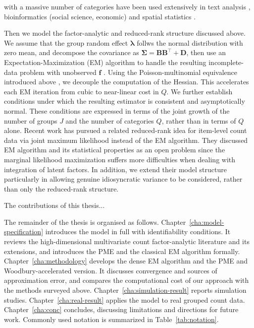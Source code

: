 with a massive number of categories have been used extensively in text analysis \citep{Taddy2015}, bioinformatics \citep{Smith2001, Buettner2015} (social science, economic) and spatial statistics \citep{Cressie2008}. 
\fi

Then we model the factor-analytic and reduced-rank structure discussed above. We assume that the group random effect $\bm{\lambda}$ follws the normal distribution with zero mean, and decompose the covariance as $\bm{\Sigma}=\mathbf{B}\mathbf{B}^{\top}+\mathbf{D}$, then use an Expectation-Maximization (EM) algorithm to handle the resulting incomplete-data problem with unobserved $\mathbf{f}$ . Using the Poisson-multinomial equivalence introduced above \citep{Baker1994, Taddy2015}, we decouple the computation of the Hessian. This accelerates each EM iteration from cubic to near-linear cost in $Q$. We further establish conditions under which the resulting estimator is consistent and asymptotically normal. These conditions are expressed in terms of the joint growth of the number of groups $J$ and the number of categories $Q$, rather than in terms of $Q$ alone. Recent work has pursued a related reduced-rank idea for item-level count data via joint maximum likelihood \citep{Cui2026} instead of the EM algorithm. They discussed EM algorithm and its statistical properties as an open problem since the marginal likelihood maximization suffers more difficulties when dealing with integration of latent factors. In addition, we extend their model structure particularly in allowing genuine idiosyncratic variance to be considered, rather than only the reduced-rank structure. 

The contributions of this thesis...
 
The remainder of the thesis is organised as follows. Chapter~\ref{cha:model-specification} introduces the model in full with identifiability conditions. It reviews the high-dimensional multivariate count factor-analytic literature and its extensions, and introduces the PME and the classical EM algorithm formally. Chapter~\ref{cha:methodology} develops the dense EM algorithm and the PME and Woodbury-accelerated version. It discusses convergence and sources of approximation error, and compares the computational cost of our approach with the methods surveyed above. Chapter~\ref{cha:simulation-result} reports simulation studies. Chapter~\ref{cha:real-result} applies the model to real grouped count data. Chapter~\ref{cha:conc} concludes, discussing limitations and directions for future work. Commonly used notation is summarized in Table~\ref{tab:notation}.

